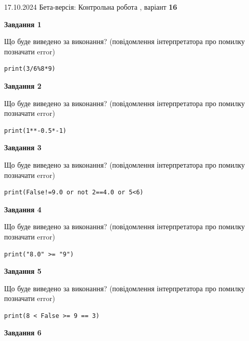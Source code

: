 \documentclass[12pt, ukrainian]{article}
\begin{document}
{\Large{17.10.2024 Бета-версія: Контрольна робота , варіант  \No \textbf { 16 }\par}}
{
\begin {large}
{\begin {center}\textbf{Завдання 1}\end {center}}

Що буде виведено за виконання? (повідомлення інтерпретатора про помилку позначати error)\par
\begin{verbatim}
print(3/6%8*9)
\end{verbatim}

{\begin {center}\textbf{Завдання 2}\end {center}}

Що буде виведено за виконання? (повідомлення інтерпретатора про помилку позначати error)\par
\begin{verbatim}
print(1**-0.5*-1)
\end{verbatim}

{\begin {center}\textbf{Завдання 3}\end {center}}

Що буде виведено за виконання? (повідомлення інтерпретатора про помилку позначати error)\par
\begin{verbatim}
print(False!=9.0 or not 2==4.0 or 5<6)
\end{verbatim}

{\begin {center}\textbf{Завдання 4}\end {center}}

Що буде виведено за виконання? (повідомлення інтерпретатора про помилку позначати error)\par
\begin{verbatim}
print("8.0" >= "9")
\end{verbatim}

{\begin {center}\textbf{Завдання 5}\end {center}}

Що буде виведено за виконання? (повідомлення інтерпретатора про помилку позначати error)\par
\begin{verbatim}
print(8 < False >= 9 == 3)
\end{verbatim}

{\begin {center}\textbf{Завдання 6}\end {center}}


\end{large}}
\end{document}
